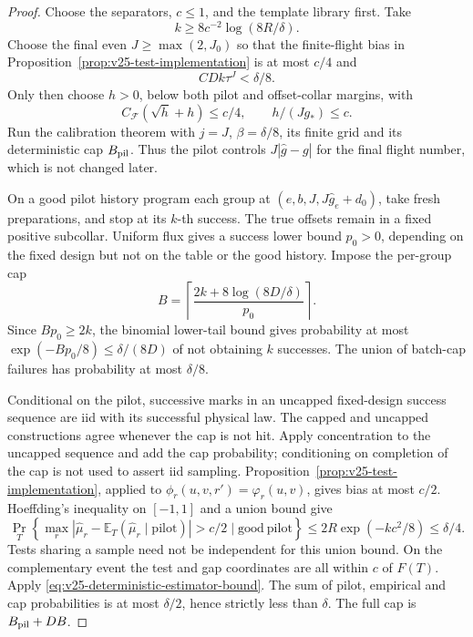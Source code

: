 \begin{proof}
Choose the separators, \(c\le1\), and the template library first.  Take
\begin{equation}\label{eq:v25-k-choice}
                         k\ge8c^{-2}\log(8R/\delta).
\end{equation}
Choose the final even \(J\ge\max(2,J_0)\) so that the finite-flight bias
in Proposition~\ref{prop:v25-test-implementation} is at most \(c/4\) and
\begin{equation}\label{eq:v25-full-transfer-budget}
                               CDk\tau^J<\delta/8.
\end{equation}
Only then choose \(h>0\), below both pilot and offset-collar margins, with
\begin{equation}\label{eq:v25-h-choice}
 C_{\mathscr F}(\sqrt h+h)\le c/4,\qquad h/(Jg_*)\le c.
\end{equation}
Run the calibration theorem with \(j=J\), \(\beta=\delta/8\), its finite
grid and its deterministic cap \(B_{\rm pil}\).  Thus the pilot controls
\(J|\widehat g-g|\) for the final flight number, which is not changed later.

On a good pilot history program each group at
\((e,b,J,J\widehat g_e+d_0)\), take fresh preparations, and stop at its
\(k\)-th success.  The true offsets remain in a fixed positive subcollar.
Uniform flux gives a success lower bound \(p_0>0\), depending on the fixed
design but not on the table or the good history.  Impose the per-group cap
\begin{equation}\label{eq:v25-post-cap}
 B=\left\lceil\frac{2k+8\log(8D/\delta)}{p_0}\right\rceil.
\end{equation}
Since \(Bp_0\ge2k\), the binomial lower-tail bound gives probability at
most \(\exp(-Bp_0/8)\le\delta/(8D)\) of not obtaining \(k\) successes.
The union of batch-cap failures has probability at most \(\delta/8\).

Conditional on the pilot, successive marks in an uncapped fixed-design
success sequence are iid with its successful physical law.  The capped and
uncapped constructions agree whenever the cap is not hit.  Apply
concentration to the uncapped sequence and add the cap probability;
conditioning on completion of the cap is not used to assert iid sampling.
Proposition~\ref{prop:v25-test-implementation}, applied to
\(\phi_r(u,v,r')=\varphi_r(u,v)\), gives bias at most \(c/2\).
Hoeffding's inequality on \([-1,1]\) and a union bound give
\[
 \Pr_T\left\{\max_r|\widehat\mu_r-
     \mathbb E_T(\widehat\mu_r\mid\mathrm{pilot})|>c/2
                        \mid\mathrm{good\ pilot}\right\}
 \le2R\exp(-kc^2/8)\le\delta/4.
\]
Tests sharing a sample need not be independent for this union bound.
On the complementary event the test and gap coordinates are all within
\(c\) of \(F(T)\).  Apply \eqref{eq:v25-deterministic-estimator-bound}.
The sum of pilot, empirical and cap probabilities is at most \(\delta/2\),
hence strictly less than \(\delta\).  The full cap is \(B_{\rm pil}+DB\).


\end{proof}
